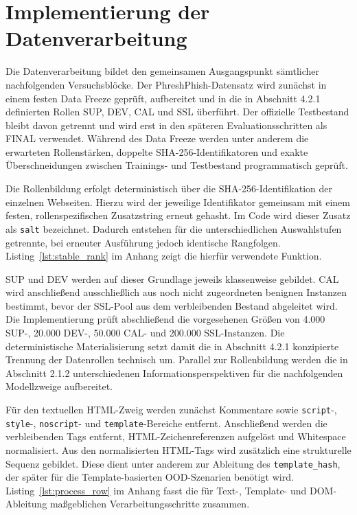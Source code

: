 \section{Implementierung der Datenverarbeitung}

Die Datenverarbeitung bildet den gemeinsamen Ausgangspunkt sämtlicher nachfolgenden
Versuchsblöcke. Der PhreshPhish-Datensatz wird zunächst in einem festen Data Freeze geprüft,
aufbereitet und in die in Abschnitt 4.2.1 definierten Rollen SUP, DEV, CAL und SSL überführt.
Der offizielle Testbestand bleibt davon getrennt und wird erst in den späteren
Evaluationsschritten als FINAL verwendet. Während des Data Freeze werden unter anderem die
erwarteten Rollenstärken, doppelte SHA-256-Identifikatoren und exakte Überschneidungen
zwischen Trainings- und Testbestand programmatisch geprüft.

Die Rollenbildung erfolgt deterministisch über die SHA-256-Identifikation der einzelnen
Webseiten. Hierzu wird der jeweilige Identifikator gemeinsam mit einem festen,
rollenspezifischen Zusatzstring erneut gehasht. Im Code wird dieser Zusatz als \texttt{salt}
bezeichnet. Dadurch entstehen für die unterschiedlichen Auswahlstufen getrennte, bei erneuter
Ausführung jedoch identische Rangfolgen. Listing~\ref{lst:stable_rank} im Anhang zeigt die hierfür
verwendete Funktion.

SUP und DEV werden auf dieser Grundlage jeweils klassenweise gebildet. CAL wird
anschließend ausschließlich aus noch nicht zugeordneten benignen Instanzen bestimmt, bevor
der SSL-Pool aus dem verbleibenden Bestand abgeleitet wird. Die Implementierung prüft
abschließend die vorgesehenen Größen von 4.000 SUP-, 20.000 DEV-, 50.000 CAL- und
200.000 SSL-Instanzen. Die deterministische Materialisierung setzt damit die in
Abschnitt 4.2.1 konzipierte Trennung der Datenrollen technisch um. Parallel zur Rollenbildung
werden die in Abschnitt 2.1.2 unterschiedenen Informationsperspektiven für die nachfolgenden
Modellzweige aufbereitet.

Für den textuellen HTML-Zweig werden zunächst Kommentare sowie \texttt{script}-,
\texttt{style}-, \texttt{noscript}- und \texttt{template}-Bereiche entfernt.
Anschließend werden die verbleibenden Tags entfernt, HTML-Zeichenreferenzen aufgelöst und
Whitespace normalisiert. Aus den normalisierten HTML-Tags wird zusätzlich eine strukturelle
Sequenz gebildet. Diese dient unter anderem zur Ableitung des \nolinkurl{template_hash}, der
später für die Template-basierten OOD-Szenarien benötigt wird.
Listing~\ref{lst:process_row} im Anhang fasst die für Text-, Template- und DOM-Ableitung maßgeblichen
Verarbeitungsschritte zusammen.

